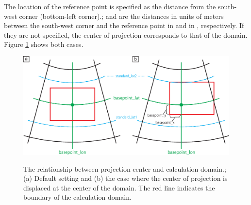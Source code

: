 The location of the reference point is specified as the distance from the south-west corner (bottom-left corner).;
 and  are the distances in units of meters between the south-west corner and the reference point in \XDIR and in \YDIR, respectively.
If they are not specified, the center of projection corresponds to that of the domain.
Figure \ref{fig:map_lc} shows both cases.

\begin{figure}[t]
\begin{center}
  \includegraphics[width=0.8\hsize]{./figure/LC_latlon_xy.eps}\\
  \caption{The relationship between projection center and calculation domain.; (a) Default setting and (b) the case where the center of projection is displaced at the center of the domain.
    The red line indicates the boundary of the calculation domain.}
  \label{fig:map_lc}
\end{center}
\end{figure}

